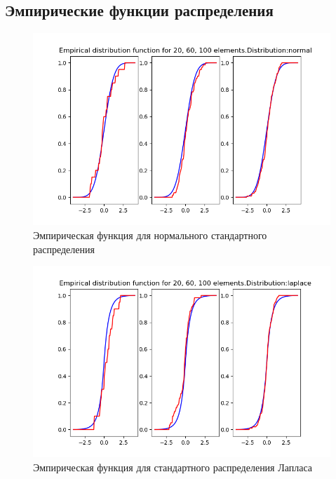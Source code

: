 \documentclass[a4]{article}
\begin{document}
\subsection{Эмпирические функции распределения}
\begin{center}

\begin{figure}[H]
\caption{Эмпирическая функция для нормального стандартного распределения}
\includegraphics[width=\textwidth]{e_normal.png}
\end{figure}

\begin{figure}[H]
\caption{Эмпирическая функция для стандартного распределения Лапласа }
\includegraphics[width=\textwidth]{e_laplace.png} 
\end{figure}


\end{center}
\end{document}
